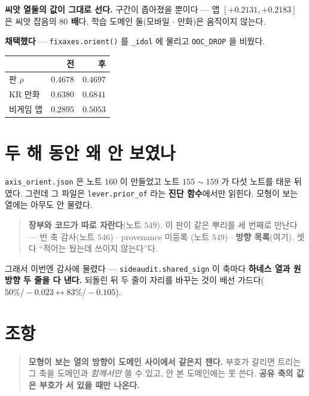 \documentclass[11pt]{article}
\begin{document}
\textbf{씨앗 열둘의 값이 그대로 선다.} 구간이 좁아졌을 뿐이다 ---
앱 $[+0.2131,+0.2183]$ 은 씨앗 잡음의 \textbf{$80$ 배}다.
학습 도메인 둘(모바일 $\cdot$ 만화)은 움직이지 않는다.

\textbf{채택했다} --- \texttt{fixaxes.orient()} 를 \texttt{\_idol} 에
물리고 \texttt{OOC\_DROP} 을 비웠다.

\begin{center}
\begin{tabular}{lrr}
\hline
 & 전 & 후 \\
\hline
판 $\rho$ & $0.4678$ & $\mathbf{0.4697}$ \\
KR 만화 & $0.6380$ & $\mathbf{0.6841}$ \\
비게임 앱 & $0.2895$ & $\mathbf{0.5053}$ \\
\hline
\end{tabular}
\end{center}

\section*{두 해 동안 왜 안 보였나}

\texttt{axis\_orient.json} 은 노트 $160$ 이 만들었고 노트 $155\!\sim\!159$
가 다섯 노트를 태운 뒤였다. 그런데 그 파일은 \texttt{lever.prior\_of} 라는
\textbf{진단 함수}에서만 읽힌다. 모형이 보는 열에는 아무도 안 물렸다.

\begin{quote}
\textbf{장부와 코드가 따로 자란다}(노트 $549$). 이 판이 같은 뿌리를
세 번째로 만난다 --- 빈 축 감사(노트 $546$) $\cdot$ provenance 미등록
(노트 $549$) $\cdot$ \textbf{방향 목록}(여기). 셋 다 ``적어는 뒀는데
쓰이지 않는다''다.
\end{quote}

그래서 이번엔 감사에 물렸다 --- \texttt{sideaudit.shared\_sign} 이 축마다
\textbf{하네스 열과 원 방향 두 줄을 다 낸다.} 되돌린 뒤 두 줄이 자리를
바꾸는 것이 배선 가드다($50\% / -0.023 \leftrightarrow 83\% / -0.105$).

\section*{조항}

\begin{quote}
\textbf{모형이 보는 열의 방향이 도메인 사이에서 같은지 잰다.} 부호가
갈리면 트리는 그 축을 도메인과 \emph{함께서만} 쓸 수 있고, 안 본
도메인에는 못 쓴다. \textbf{공유 축의 값은 부호가 서 있을 때만 나온다.}
\end{quote}
\end{document}
